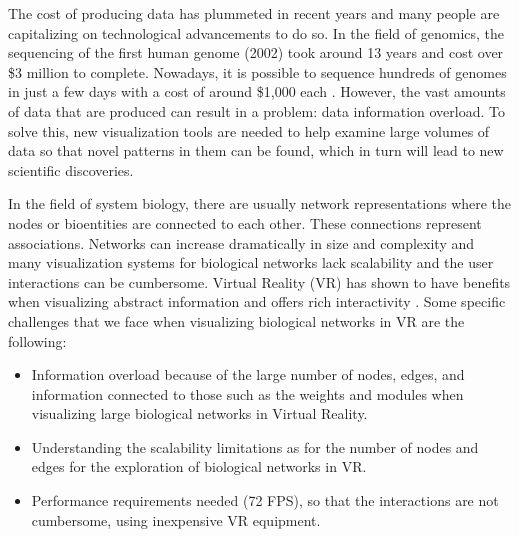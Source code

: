 
The cost of producing data has plummeted in recent years and many people are capitalizing on technological advancements to do so. In the field of genomics, the sequencing of the first human genome (2002) took around 13 years and cost over \$3 million to complete. Nowadays, it is possible to sequence hundreds of genomes in just a few days with a cost of around \$1,000 each \cite{big_biological_impacts_bd}. However, the vast amounts of data that are produced can result in a problem: data information overload. To solve this, new visualization tools are needed to help examine large volumes of data so that novel patterns in them can be found, which in turn will lead to new scientific discoveries.



In the field of system biology, there are usually network representations where the nodes or bioentities are connected to each other. These connections represent associations. Networks can increase dramatically in size and complexity and many visualization systems for biological networks lack scalability and the user interactions can be cumbersome. Virtual Reality (VR) has shown to have benefits when visualizing abstract information and offers rich interactivity \cite{zhang_paciorkowski_craig_cui_2019}. Some specific challenges that we face when visualizing biological networks in VR are the following:
\begin{itemize}
  \item Information overload because of the large number of nodes, edges, and information connected to those such as the weights and modules when visualizing large biological networks in Virtual Reality.
  \item Understanding the scalability limitations as for the number of nodes and edges for the exploration of biological networks in VR.
  \item Performance requirements needed (72 FPS), so that the interactions are not cumbersome, using inexpensive VR equipment.
\end{itemize}

